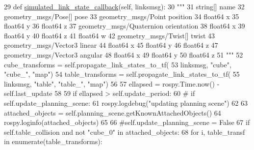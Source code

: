 \begin{DoxyCode}
29     \textcolor{keyword}{def }\hyperlink{classfake__cube__perception__node_1_1FakePerceptionNode_ac1127eae8d2eda994b22873529bd198f}{simulated\_link\_state\_callback}(self, linksmsg):
30         \textcolor{stringliteral}{"""}
31 \textcolor{stringliteral}{        string[] name}
32 \textcolor{stringliteral}{        geometry\_msgs/Pose[] pose}
33 \textcolor{stringliteral}{          geometry\_msgs/Point position}
34 \textcolor{stringliteral}{            float64 x}
35 \textcolor{stringliteral}{            float64 y}
36 \textcolor{stringliteral}{            float64 z}
37 \textcolor{stringliteral}{          geometry\_msgs/Quaternion orientation}
38 \textcolor{stringliteral}{            float64 x}
39 \textcolor{stringliteral}{            float64 y}
40 \textcolor{stringliteral}{            float64 z}
41 \textcolor{stringliteral}{            float64 w}
42 \textcolor{stringliteral}{        geometry\_msgs/Twist[] twist}
43 \textcolor{stringliteral}{          geometry\_msgs/Vector3 linear}
44 \textcolor{stringliteral}{            float64 x}
45 \textcolor{stringliteral}{            float64 y}
46 \textcolor{stringliteral}{            float64 z}
47 \textcolor{stringliteral}{          geometry\_msgs/Vector3 angular}
48 \textcolor{stringliteral}{            float64 x}
49 \textcolor{stringliteral}{            float64 y}
50 \textcolor{stringliteral}{            float64 z}
51 \textcolor{stringliteral}{        """}
52         cube\_transforms = self.propagate\_link\_states\_to\_tf(
53             linksmsg, \textcolor{stringliteral}{"cube"}, \textcolor{stringliteral}{"cube\_"}, \textcolor{stringliteral}{"map"})
54         table\_transforms = self.propagate\_link\_states\_to\_tf(
55             linksmsg, \textcolor{stringliteral}{"table"}, \textcolor{stringliteral}{"table\_"}, \textcolor{stringliteral}{"map"})
56 
57         ellapsed = rospy.Time.now() - self.last\_update
58 
59         \textcolor{keywordflow}{if} ellapsed > self.update\_period:
60             \textcolor{comment}{# if self.update\_planning\_scene:}
61             rospy.logdebug(\textcolor{stringliteral}{"updating planning scene"})
62 
63             attached\_objects = self.planning\_scene.getKnownAttachedObjects()
64             rospy.loginfo(attached\_objects)
65 
66             \textcolor{comment}{#self.update\_planning\_scene = False}
67             \textcolor{keywordflow}{if} self.table\_collision \textcolor{keywordflow}{and} \textcolor{keywordflow}{not} \textcolor{stringliteral}{"cube\_0"} \textcolor{keywordflow}{in} attached\_objects:
68                 \textcolor{keywordflow}{for} i, table\_transf \textcolor{keywordflow}{in} enumerate(table\_transforms):

\end{DoxyCode}
